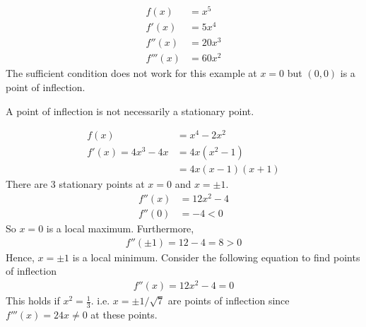 \begin{ex}
\begin{align*}
f(x) & = x^5 \\
f'(x) & = 5x^4 \\
f''(x) & = 20x^3 \\
f'''(x) & = 60x^2
\end{align*}
The sufficient condition does not work for this example at $x=0$ but $(0,0)$ is a point of inflection.
\end{ex}
A point of inflection is not necessarily a stationary point.
\begin{ex}
\begin{align*}
f(x) & = x^4 -2x^2 \\
f'(x) = 4x^3 -4x & = 4x \left(x^2-1 \right) \\
& = 4x(x-1)(x+1)
\end{align*}
There are 3 stationary points at $x=0$ and $x = \pm 1$.
\begin{align*}
f''(x) & = 12 x^2 -4 \\
f''(0) & = -4 <0
\end{align*}
So $x=0$ is a local maximum. Furthermore,
\begin{align*}
f''(\pm 1) = 12 - 4 = 8 > 0
\end{align*}
Hence, $x = \pm 1$ is a local minimum. Consider the following equation to find points of inflection
\begin{align*}
f''(x) = 12x^2 - 4 = 0 
\end{align*}
This holds if $x^2 = \frac 1 3$. i.e. $x = \pm 1 /\sqrt 7$ are points of inflection since $f'''(x) = 24x \neq 0$ at these points.
\end{ex}

